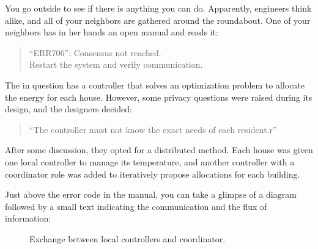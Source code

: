 \documentclass[../main.tex]{subfiles}
\begin{document}
You go outside to see if there is anything you can do.
Apparently, engineers think alike, and all of your neighbors are gathered around the roundabout.
One of your neighbors has in her hands an open manual and reads it:
\begin{quote}
  ``ERR706'': Consensus not reached.\\
  Restart the system and verify communication.
\end{quote}

The \dhn{} in question has a controller that solves an optimization problem to allocate the energy for each house.
However, some privacy questions were raised during its design, and the designers decided:
\begin{quote}
  ``The controller must not know the exact needs of each resident.r''
\end{quote}

After some discussion, they opted for a distributed method.
Each house was given one local controller to manage its temperature, and another controller with a coordinator role was added to iteratively propose allocations for each building.

Just above the error code in the manual, you can take a glimpse of a diagram followed by a small text indicating the communication and the flux of information:
\begin{figure}[H]
  \centering
  \caption{Exchange between local controllers and coordinator.}\label{fig:ex_exchange_agents}
\end{figure}
\end{document}
